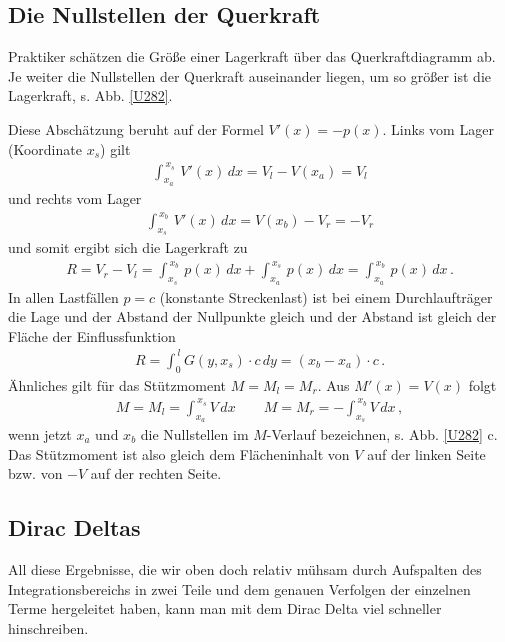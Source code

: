 {\textcolor{sectionTitleBlue}{\section{Die Nullstellen der Querkraft}}}
Praktiker sch\"{a}tzen die Gr\"{o}{\ss}e einer Lagerkraft \"{u}ber das Querkraftdiagramm ab. Je weiter die Nullstellen der Querkraft auseinander liegen, um so gr\"{o}{\ss}er ist die Lagerkraft, s. Abb. \ref{U282}.

Diese Absch\"{a}tzung beruht auf der Formel $V'(x) = - p(x)$. Links vom Lager (Koordinate $x_s$) gilt
\begin{align}
\int_{x_a}^{\,x_s}\,V'(x)\,dx = V_l - V(x_a) = V_l
\end{align}
und rechts vom Lager
\begin{align}
\int_{x_s}^{\,x_b}\,V'(x)\,dx = V(x_b) - V_r = - V_r
\end{align}
und somit ergibt sich die Lagerkraft zu
\begin{align}
R = V_r - V_l = \int_{x_s}^{\,x_b}\,p(x)\,dx + \int_{x_a}^{\,x_s}\,p(x)\,dx = \int_{x_a}^{\,x_b} \,p(x)\,dx\,.
\end{align}
In allen Lastf\"{a}llen $p = c$ (konstante Streckenlast) ist bei einem Durchlauftr\"{a}ger die Lage und der Abstand der Nullpunkte gleich und der Abstand ist gleich der Fl\"{a}che der Einflussfunktion
\begin{align}
R = \int_0^{\,l}  G(y,x_s) \cdot c\,dy = (x_b - x_a) \cdot c\,.
\end{align}
\"{A}hnliches gilt f\"{u}r das St\"{u}tzmoment $M = M_l = M_r$. Aus $M'(x) = V(x)$ folgt
\begin{align}
M = M_l = \int_{x_a}^{\,x_s} V\,dx \qquad M = M_r = -\int_{x_s}^{\,x_b} V\,dx\,,
\end{align}
wenn jetzt $x_a$ und $x_b$ die Nullstellen im $M$-Verlauf bezeichnen, s. Abb. \ref{U282} c. Das St\"{u}tzmoment ist also gleich dem Fl\"{a}cheninhalt von $V$ auf der linken Seite bzw. von $-V$ auf der rechten Seite.

{\textcolor{sectionTitleBlue}{\section{Dirac Deltas}}}
All diese Ergebnisse, die wir oben doch relativ m\"{u}hsam durch Aufspalten des Integrationsbereichs in zwei Teile und dem genauen Verfolgen der einzelnen Terme hergeleitet haben, kann man mit dem
Dirac Delta viel schneller hinschreiben.

